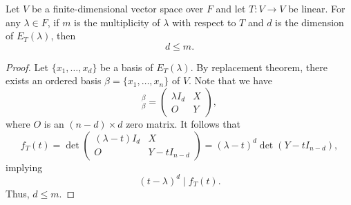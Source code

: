 \begin{theorem}
  Let $V$ be a finite-dimensional vector space over $F$ and let $T: V \to V$ be
  linear.
  For any $\lambda \in F$, if $m$ is the multiplicity of $\lambda$ with respect
  to $T$ and $d$ is the dimension of $E_T(\lambda)$, then
  \begin{equation*}
    d \leq m.
  \end{equation*}
\end{theorem}
\begin{proof}
  Let $\{x_1, \dots, x_d\}$ be a basis of $E_T(\lambda)$.
  By replacement theorem, there exists an ordered basis $\beta = \{x_1, \dots,
  x_n\}$ of $V$.
  Note that we have
  \begin{equation*}
    [T]_\beta^\beta =
    \begin{pmatrix}
      \lambda I_d & X \\
      O & Y
    \end{pmatrix},
  \end{equation*}
  where $O$ is an $(n-d) \times d$ zero matrix.
  It follows that
  \begin{equation*}
    f_T(t) = \det
    \begin{pmatrix}
      (\lambda - t)I_d & X \\
      O & Y - tI_{n-d}
    \end{pmatrix}
    = (\lambda - t)^d \det(Y - tI_{n-d}),
  \end{equation*}
  implying
  \begin{equation*}
    (t - \lambda)^d \mid f_T(t).
  \end{equation*}
  Thus, $d \leq m$.
\end{proof}

